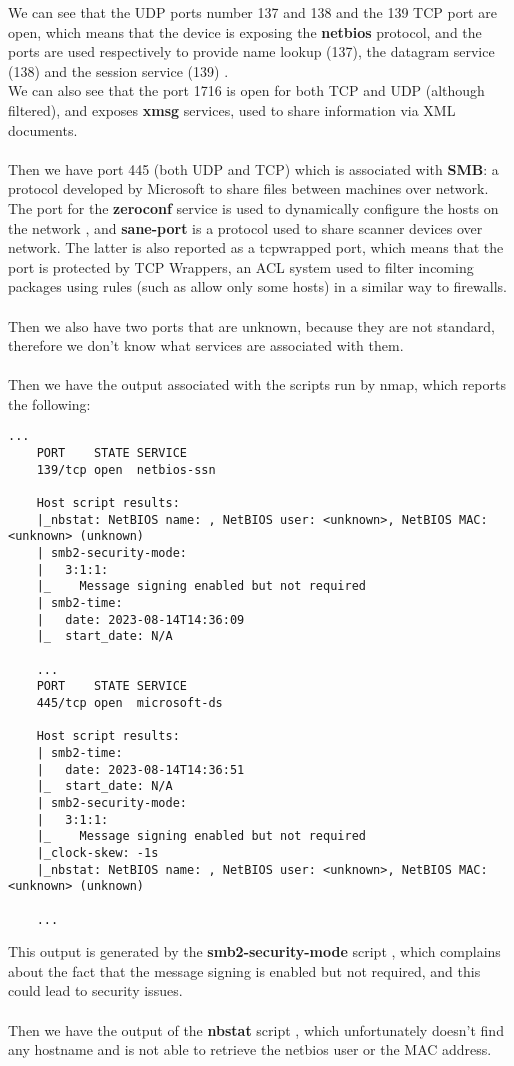 We can see that the UDP ports number 137 and 138 and the 139 TCP port are open,
which means that the device is exposing the \textbf{netbios} protocol, and the ports are used
respectively to provide name lookup (137), the datagram service (138) and the session
service (139) \cite{netbios-ws}\cite{netbios-smb}.\\
We can also see that the port 1716 is open for both TCP and UDP (although filtered), and exposes
\textbf{xmsg} services, used to share information via XML documents.\\\\
Then we have port 445 (both UDP and TCP) which is associated with \textbf{SMB}:
a protocol developed by Microsoft to share files between machines over network.\\
The port for the \textbf{zeroconf} service is used to dynamically configure the
hosts on the network \cite{zeroconf}, and \textbf{sane-port} is a protocol used
to share scanner devices over network. The latter is also reported as a tcpwrapped port, which means
that the port is protected by TCP Wrappers, an ACL system used to filter incoming packages
using rules (such as allow only some hosts) in a similar way to firewalls. \\\\
Then we also have two ports that are unknown, because they are not standard, therefore we don't know what services
are associated with them.\\\\
Then we have the output associated with the scripts run by nmap, which reports the following:
\begin{lstlisting}[numbers=none]
    ...
    PORT    STATE SERVICE
    139/tcp open  netbios-ssn

    Host script results:
    |_nbstat: NetBIOS name: , NetBIOS user: <unknown>, NetBIOS MAC: <unknown> (unknown)
    | smb2-security-mode: 
    |   3:1:1: 
    |_    Message signing enabled but not required
    | smb2-time: 
    |   date: 2023-08-14T14:36:09
    |_  start_date: N/A

    ...
    PORT    STATE SERVICE
    445/tcp open  microsoft-ds

    Host script results:
    | smb2-time: 
    |   date: 2023-08-14T14:36:51
    |_  start_date: N/A
    | smb2-security-mode: 
    |   3:1:1: 
    |_    Message signing enabled but not required
    |_clock-skew: -1s
    |_nbstat: NetBIOS name: , NetBIOS user: <unknown>, NetBIOS MAC: <unknown> (unknown)

    ...
\end{lstlisting}
This output is generated by the \textbf{smb2-security-mode} script \cite{smb-script},
which complains about the fact that the message signing is enabled but not required,
and this could lead to security issues.\\\\
Then we have the output of the \textbf{nbstat} script \cite{nbstat}, which
unfortunately doesn't find any hostname and is not able to retrieve the netbios user or the MAC address.
\newpage